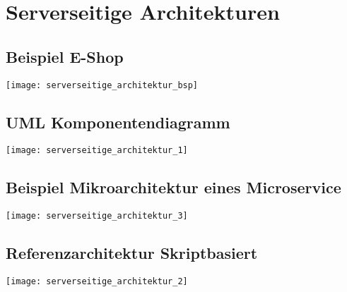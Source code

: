 
\section{Serverseitige Architekturen}
\subsection{Beispiel E-Shop}
\texttt{[image: serverseitige\_architektur\_bsp]}
\subsection{UML Komponentendiagramm}
\texttt{[image: serverseitige\_architektur\_1]}
\subsection{Beispiel Mikroarchitektur eines Microservice}
\texttt{[image: serverseitige\_architektur\_3]}
\subsection{Referenzarchitektur Skriptbasiert}
\texttt{[image: serverseitige\_architektur\_2]}